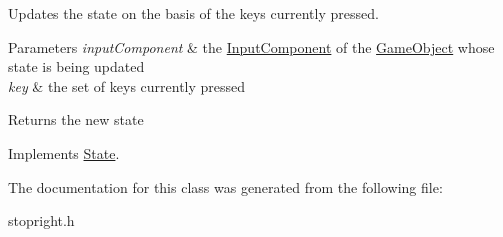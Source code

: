 Updates the state on the basis of the keys currently pressed. 


\begin{DoxyParams}{Parameters}
{\em input\-Component} & the \hyperlink{classInputComponent}{Input\-Component} of the \hyperlink{classGameObject}{Game\-Object} whose state is being updated \\
\hline
{\em key} & the set of keys currently pressed \\
\hline
\end{DoxyParams}
\begin{DoxyReturn}{Returns}
the new state 
\end{DoxyReturn}


Implements \hyperlink{classState_a5f2bc9804614c5ca9e7feb7d8c57668d}{State}.



The documentation for this class was generated from the following file\-:\begin{DoxyCompactItemize}
\item 
stopright.\-h\end{DoxyCompactItemize}
